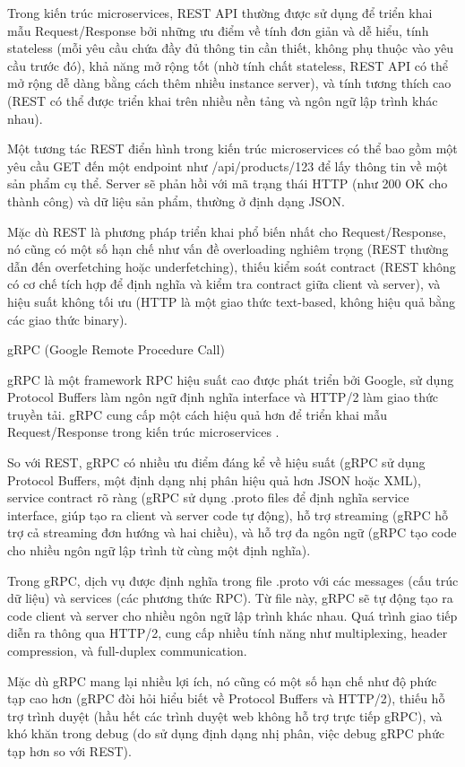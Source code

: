 Trong kiến trúc microservices, REST API thường được sử dụng để triển khai mẫu Request/Response bởi những ưu điểm về tính đơn giản và dễ hiểu, tính stateless (mỗi yêu cầu chứa đầy đủ thông tin cần thiết, không phụ thuộc vào yêu cầu trước đó), khả năng mở rộng tốt (nhờ tính chất stateless, REST API có thể mở rộng dễ dàng bằng cách thêm nhiều instance server), và tính tương thích cao (REST có thể được triển khai trên nhiều nền tảng và ngôn ngữ lập trình khác nhau).

Một tương tác REST điển hình trong kiến trúc microservices có thể bao gồm một yêu cầu GET đến một endpoint như /api/products/123 để lấy thông tin về một sản phẩm cụ thể. Server sẽ phản hồi với mã trạng thái HTTP (như 200 OK cho thành công) và dữ liệu sản phẩm, thường ở định dạng JSON.

Mặc dù REST là phương pháp triển khai phổ biến nhất cho Request/Response, nó cũng có một số hạn chế như vấn đề overloading nghiêm trọng (REST thường dẫn đến overfetching hoặc underfetching), thiếu kiểm soát contract (REST không có cơ chế tích hợp để định nghĩa và kiểm tra contract giữa client và server), và hiệu suất không tối ưu (HTTP là một giao thức text-based, không hiệu quả bằng các giao thức binary).

gRPC (Google Remote Procedure Call)

gRPC là một framework RPC hiệu suất cao được phát triển bởi Google, sử dụng Protocol Buffers làm ngôn ngữ định nghĩa interface và HTTP/2 làm giao thức truyền tải. gRPC cung cấp một cách hiệu quả hơn để triển khai mẫu Request/Response trong kiến trúc microservices \cite{indrasiri2020}.

So với REST, gRPC có nhiều ưu điểm đáng kể về hiệu suất (gRPC sử dụng Protocol Buffers, một định dạng nhị phân hiệu quả hơn JSON hoặc XML), service contract rõ ràng (gRPC sử dụng .proto files để định nghĩa service interface, giúp tạo ra client và server code tự động), hỗ trợ streaming (gRPC hỗ trợ cả streaming đơn hướng và hai chiều), và hỗ trợ đa ngôn ngữ (gRPC tạo code cho nhiều ngôn ngữ lập trình từ cùng một định nghĩa).

Trong gRPC, dịch vụ được định nghĩa trong file .proto với các messages (cấu trúc dữ liệu) và services (các phương thức RPC). Từ file này, gRPC sẽ tự động tạo ra code client và server cho nhiều ngôn ngữ lập trình khác nhau. Quá trình giao tiếp diễn ra thông qua HTTP/2, cung cấp nhiều tính năng như multiplexing, header compression, và full-duplex communication.

Mặc dù gRPC mang lại nhiều lợi ích, nó cũng có một số hạn chế như độ phức tạp cao hơn (gRPC đòi hỏi hiểu biết về Protocol Buffers và HTTP/2), thiếu hỗ trợ trình duyệt (hầu hết các trình duyệt web không hỗ trợ trực tiếp gRPC), và khó khăn trong debug (do sử dụng định dạng nhị phân, việc debug gRPC phức tạp hơn so với REST).

